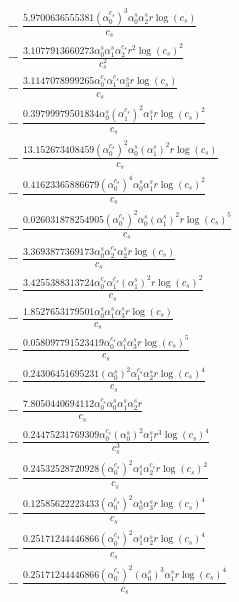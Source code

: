 \documentclass[10pt]{article}
\begin{document}
\begin{align*}
&{}  - \frac{5.9700636555381 \left(\alpha_{0}^{c_s}\right)^{3} \alpha_{0}^s \alpha_{2}^s r \log{\left(c_{s} \right)}}{c_{s}} \\
&{}  - \frac{3.1077913660273 \alpha_{0}^s \alpha_{1}^s \alpha_{2}^{c_s} r^{2} \log{\left(c_{s} \right)}^{2}}{c_{s}^{2}} \\
&{}  - \frac{3.1147078999265 \alpha_{0}^{c_s} \alpha_{1}^{c_s} \alpha_{3}^s r \log{\left(c_{s} \right)}}{c_{s}} \\
&{}  - \frac{0.39799979501834 \alpha_{0}^s \left(\alpha_{1}^{c_s}\right)^{2} \alpha_{1}^s r \log{\left(c_{s} \right)}^{2}}{c_{s}} \\
&{}  - \frac{13.152673408459 \left(\alpha_{0}^{c_s}\right)^{2} \alpha_{0}^s \left(\alpha_{1}^s\right)^{2} r \log{\left(c_{s} \right)}}{c_{s}} \\
&{}  - \frac{0.41623365886679 \left(\alpha_{0}^{c_s}\right)^{4} \alpha_{0}^s \alpha_{1}^s r \log{\left(c_{s} \right)}^{2}}{c_{s}} \\
&{}  - \frac{0.026031878254905 \left(\alpha_{0}^{c_s}\right)^{2} \alpha_{0}^s \left(\alpha_{1}^s\right)^{2} r \log{\left(c_{s} \right)}^{5}}{c_{s}} \\
&{}  - \frac{3.3693877369173 \alpha_{0}^s \alpha_{2}^{c_s} \alpha_{2}^s r \log{\left(c_{s} \right)}}{c_{s}} \\
&{}  - \frac{3.4255388313724 \alpha_{0}^{c_s} \alpha_{1}^{c_s} \left(\alpha_{1}^s\right)^{2} r \log{\left(c_{s} \right)}^{2}}{c_{s}} \\
&{}  - \frac{1.8527653179501 \alpha_{0}^s \alpha_{1}^s \alpha_{3}^s r \log{\left(c_{s} \right)}}{c_{s}} \\
&{}  - \frac{0.058097791523419 \alpha_{0}^{c_s} \alpha_{1}^s \alpha_{3}^s r \log{\left(c_{s} \right)}^{5}}{c_{s}} \\
&{}  - \frac{0.24306451695231 \left(\alpha_{0}^s\right)^{2} \alpha_{1}^{c_s} \alpha_{2}^s r \log{\left(c_{s} \right)}^{4}}{c_{s}} \\
&{}  - \frac{7.8050440694112 \alpha_{0}^{c_s} \alpha_{0}^s \alpha_{1}^s \alpha_{2}^s r}{c_{s}} \\
&{}  - \frac{0.24475231769309 \alpha_{0}^{c_s} \left(\alpha_{0}^s\right)^{2} \alpha_{1}^s r^{3} \log{\left(c_{s} \right)}^{4}}{c_{s}^{3}} \\
&{}  - \frac{0.24532528720928 \left(\alpha_{0}^{c_s}\right)^{2} \alpha_{1}^s \alpha_{2}^{c_s} r \log{\left(c_{s} \right)}^{2}}{c_{s}} \\
&{}  - \frac{0.12585622223433 \left(\alpha_{0}^{c_s}\right)^{2} \alpha_{0}^s \alpha_{3}^s r \log{\left(c_{s} \right)}^{4}}{c_{s}} \\
&{}  - \frac{0.25171244446866 \left(\alpha_{0}^{c_s}\right)^{2} \alpha_{1}^s \alpha_{2}^s r \log{\left(c_{s} \right)}^{4}}{c_{s}} \\
&{}  - \frac{0.25171244446866 \left(\alpha_{0}^{c_s}\right)^{2} \left(\alpha_{0}^s\right)^{3} \alpha_{1}^s r \log{\left(c_{s} \right)}^{4}}{c_{s}}
\end{align*}
\end{document}
